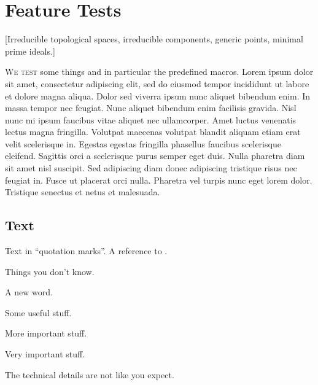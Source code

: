 \chapter{Feature Tests}

[Irreducible topological spaces, irreducible components, generic points, minimal prime ideals.]

\lettrine{W}{e test} some things and in particular the predefined macros.
Lorem ipsum dolor sit amet, consectetur adipiscing elit, sed do eiusmod tempor incididunt ut labore et dolore magna aliqua. Dolor sed viverra ipsum nunc aliquet bibendum enim. In massa tempor nec feugiat. Nunc aliquet bibendum enim facilisis gravida. Nisl nunc mi ipsum faucibus vitae aliquet nec ullamcorper. Amet luctus venenatis lectus magna fringilla. Volutpat maecenas volutpat blandit aliquam etiam erat velit scelerisque in. Egestas egestas fringilla phasellus faucibus scelerisque eleifend. Sagittis orci a scelerisque purus semper eget duis. Nulla pharetra diam sit amet nisl suscipit. Sed adipiscing diam donec adipiscing tristique risus nec feugiat in. Fusce ut placerat orci nulla. Pharetra vel turpis nunc eget lorem dolor. Tristique senectus et netus et malesuada.





\section{Text}

Text in \enquote{quotation marks}.
A reference to \cite{lee}.

\begin{recall}
  Things you don’t know.
\end{recall}

\begin{definition}
  A new word.
\end{definition}

\begin{lemma}
  Some useful stuff.
\end{lemma}

\begin{proposition}
  More important stuff.
\end{proposition}

\begin{theorem}
  Very important stuff.
\end{theorem}

\begin{warning}
  The technical details are not like you expect.
\end{warning}


